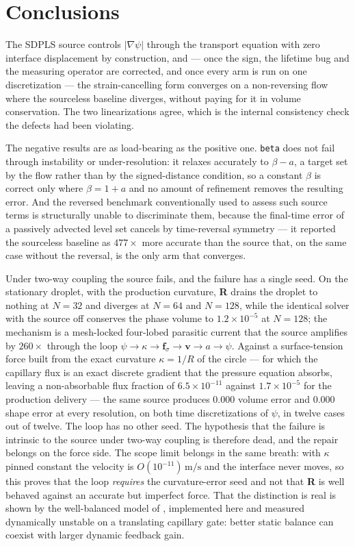 \documentclass[preprint,3p,11pt]{elsarticle}
\newcommand{\psilev}{\psi}
\newcommand{\gradpsi}{\lvert\nabla\psilev\rvert}
\begin{document}
\section{Conclusions}
The SDPLS source controls $\gradpsi$ through the transport equation with zero
interface displacement by construction, and --- once the sign, the lifetime bug
and the measuring operator are corrected, and once every arm is run on one
discretization --- the strain-cancelling form converges on a non-reversing flow
where the sourceless baseline diverges, without paying for it in volume
conservation. The two linearizations agree, which is the internal consistency
check the defects had been violating.

The negative results are as load-bearing as the positive one. \texttt{beta} does
not fail through instability or under-resolution: it relaxes accurately to
$\beta - a$, a target set by the flow rather than by the signed-distance
condition, so a constant $\beta$ is correct only where $\beta = 1 + a$ and no
amount of refinement removes the resulting error. And the reversed benchmark
conventionally used to assess such source terms is structurally unable to
discriminate them, because the final-time error of a passively advected level
set cancels by time-reversal symmetry --- it reported the sourceless baseline
as $477\times$ more accurate than the source that, on the same case without the
reversal, is the only arm that converges.

Under two-way coupling the source fails, and the failure has a single seed. On
the stationary droplet, with the production curvature, \textbf{R} drains the
droplet to nothing at $N=32$ and diverges at $N=64$ and $N=128$, while the
identical solver with the source off conserves the phase volume to
$1.2\times10^{-5}$ at $N=128$; the mechanism is a mesh-locked four-lobed
parasitic current that the source amplifies by $260\times$ through the loop
$\psilev \rightarrow \kappa \rightarrow \mathbf{f}_\sigma \rightarrow
\mathbf{v} \rightarrow a \rightarrow \psilev$. Against a surface-tension force
built from the exact curvature $\kappa = 1/R$ of the circle --- for which the
capillary flux is an exact discrete gradient that the pressure equation absorbs,
leaving a non-absorbable flux fraction of $6.5\times10^{-11}$ against
$1.7\times10^{-5}$ for the production delivery --- the same source produces
$0.000$ volume error and $0.000$ shape error at every resolution, on both time
discretizations of $\psilev$, in twelve cases out of twelve. The loop has no
other seed. The hypothesis that the failure is intrinsic to the source under
two-way coupling is therefore dead, and the repair belongs on the force side.
The scope limit belongs in the same breath: with $\kappa$ pinned constant the
velocity is $O(10^{-11})\,\mathrm{m/s}$ and the interface never moves, so this
proves that the loop \emph{requires} the curvature-error seed and not that
\textbf{R} is well behaved against an accurate but imperfect force. That the
distinction is real is shown by the well-balanced model of
\cite{abualsaud2018}, implemented here and measured dynamically unstable on a
translating capillary gate: better static balance can coexist with larger
dynamic feedback gain.
\end{document}

